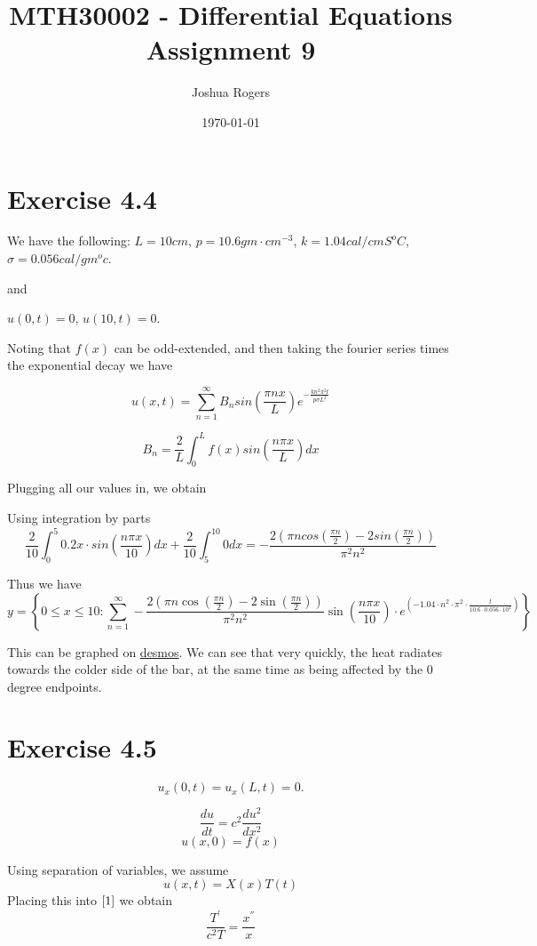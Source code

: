 \documentclass{article}
\title{\vspace{-4cm}MTH30002 - Differential Equations Assignment 9}
\author{Joshua Rogers}
\date\today
\begin{document}
\maketitle

\section*{Exercise 4.4}
We have the following: $L=10cm$, $p = 10.6 gm \cdot cm^{-3}$, $k=1.04 cal/cm S^oC$, $\sigma = 0.056 cal/gm^oc$.

and

$u(0,t) = 0$, $u(10,t)=0$.

Noting that $f(x)$ can be odd-extended, and then taking the fourier series times the exponential decay we have

$$u(x,t) = \sum_{n=1}^{\infty} B_n sin\left( \frac{\pi n x}{L}\right) e^{-\frac{k n^2 \pi^2 t}{p \sigma L^2}}$$

$$B_n = \frac{2}{L} \int_0^L f(x) sin\left(\frac{n \pi x}{L}\right) dx$$

Plugging all our values in, we obtain

Using integration by parts
$$
\frac{2}{10} \int_0^{5} 0.2x \cdot sin\left(\frac{n \pi x}{10}\right)dx + \frac{2}{10} \int_5^{10} 0 dx = - \frac{2\left(\pi n cos(\frac{\pi n}{2}) -2sin(\frac{\pi n}{2})\right)}{\pi^2n^2}
$$

Thus we have
$$y=\left\{0\le x\le10:\sum_{n=1}^{\infty}-\frac{2\left(\pi n\cos\left(\frac{\pi n}{2}\right)-2\sin\left(\frac{\pi n}{2}\right)\right)}{\pi^{2}n^{2}}\sin\left(\frac{n\pi x}{10}\right)\cdot e^{\left(-1.04\cdot n^{2}\cdot\pi^{2}\cdot\frac{t}{10.6\cdot0.056\cdot10^{2}}\right)}\right\}$$

This can be graphed on \href{https://www.desmos.com/calculator/39jwqygv96}{desmos}. We can see that very quickly, the heat radiates towards the colder side of the bar, at the same time as being affected by the 0 degree endpoints.

\section*{Exercise 4.5}

$$
u_x(0,t) = u_x(L,t) =0.
$$

\begin{equation}\label{1}
\frac{du}{dt} = c^2 \frac{du^2}{dx^2}
\end{equation}
$$
u(x,0) = f(x)
$$

Using separation of variables, we assume
\begin{equation}\label{2}
u(x,t) = X(x)T(t)
\end{equation}
Placing this into $\eqref{1}$ we obtain
$$
\frac{T^{'}}{c^2T} = \frac{x^{''}}{x}
$$
\end{document}
